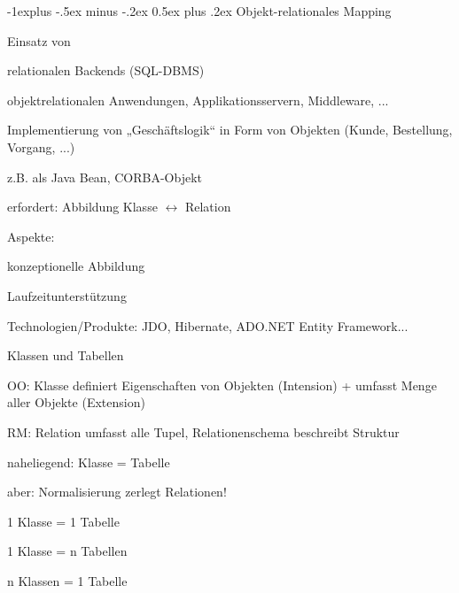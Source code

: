 \documentclass[a4paper]{article}
\makeatletter
\renewcommand{\subsection}{\@startsection{subsection}{2}{0mm}%
                                {-1explus -.5ex minus -.2ex}%
                                {0.5ex plus .2ex}%
                                {\normalfont\normalsize\bfseries}}
\makeatother
\begin{document}
\begin{multicols}{3}
    \subsection{Objekt-relationales Mapping}
    \begin{itemize*}
        \item Einsatz von
        \begin{itemize*}
            \item relationalen Backends (SQL-DBMS)
            \item objektrelationalen Anwendungen, Applikationsservern, Middleware, ...
        \end{itemize*}
        \item Implementierung von „Geschäftslogik“ in Form von Objekten (Kunde, Bestellung, Vorgang, ...)
        \begin{itemize*}
            \item z.B. als Java Bean, CORBA-Objekt
        \end{itemize*}
        \item erfordert: Abbildung Klasse $\leftrightarrow$ Relation
        \item Aspekte:
        \begin{itemize*}
            \item konzeptionelle Abbildung
            \item Laufzeitunterstützung
        \end{itemize*}
        \item Technologien/Produkte: JDO, Hibernate, ADO.NET Entity Framework...
    \end{itemize*}


    Klassen und Tabellen
    \begin{itemize*}
        \item OO: Klasse definiert Eigenschaften von Objekten (Intension) + umfasst Menge aller Objekte (Extension)
        \item RM: Relation umfasst alle Tupel, Relationenschema beschreibt Struktur
        \item naheliegend: Klasse = Tabelle
        \item aber: Normalisierung zerlegt Relationen!
        \begin{itemize*}
            \item 1 Klasse = 1 Tabelle
            \item 1 Klasse = n Tabellen
            \item n Klassen = 1 Tabelle
        \end{itemize*}
    \end{itemize*}


\end{multicols}
\end{document}
